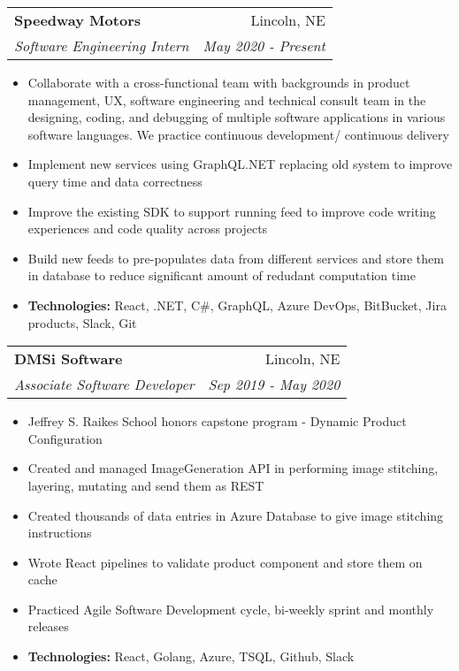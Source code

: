 \documentclass[letterpaper,10pt]{article}
\makeatletter
\newcommand{\resumeSubheading}[4]{
  \vspace{-1pt}\item[]
  \begin{tabular*}{0.98\textwidth}{l@{\extracolsep{\fill}}r}
      \hspace{-10pt}\textbf{#1} & #2 \\
      \hspace{-10pt}\textit{\small#3} & \textit{\small #4} \\
    \end{tabular*}\vspace{-5pt}
}
\newcommand{\resumeItemListStart}{\begin{itemize}}
\newcommand{\resumeItemListEnd}{\end{itemize}\vspace{-5pt}}
\makeatother
\begin{document}
    \resumeSubheading
        {Speedway Motors}{Lincoln, NE}
        {Software Engineering Intern}{May 2020 - Present}
        \resumeItemListStart
            \small
                \item Collaborate with a cross-functional team with backgrounds in product management, UX, software engineering and technical consult team in the designing, coding, and debugging of multiple software applications in various software languages. We practice continuous development/ continuous delivery
                \item Implement new services using GraphQL.NET replacing old system to improve query time and data correctness
                \item Improve the existing SDK to support running feed to improve code writing experiences and code quality across projects
                \item Build new feeds to pre-populates data from different services and store them in database to reduce significant amount of redudant computation time
                \item \textbf{Technologies: } React, .NET, C\#, GraphQL, Azure DevOps, BitBucket, Jira products, Slack, Git
        \resumeItemListEnd
      
    \resumeSubheading
        {DMSi Software}{Lincoln, NE}
        {Associate Software Developer}{Sep 2019 - May 2020}
        \resumeItemListStart
            \small
                \item Jeffrey S. Raikes School honors capstone program - Dynamic Product Configuration
                \item Created and managed ImageGeneration API in performing image stitching, layering, mutating and send them as REST
                \item Created thousands of data entries in Azure Database to give image stitching instructions
                \item Wrote React pipelines to validate product component and store them on cache
                \item Practiced Agile Software Development cycle, bi-weekly sprint and monthly releases
                \item \textbf{Technologies: } React, Golang, Azure, TSQL, Github, Slack 
        \resumeItemListEnd
\end{document}
